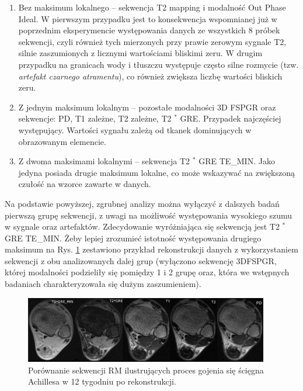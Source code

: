 \begin{enumerate}
	\item Bez maksimum lokalnego -- sekwencja T2 mapping i modalność Out Phase Ideal. W pierwszym przypadku jest to konsekwencja wspomnianej już w poprzednim eksperymencie występowania danych ze wszystkich 8 próbek sekwencji, czyli również tych mierzonych przy prawie zerowym sygnale T2, silnie zaszumionych z licznymi wartościami bliskimi zeru. W drugim przypadku na granicach wody i tłuszczu występuje często silne rozmycie (tzw. \textit{artefakt czarnego atramentu}), co również zwiększa liczbę wartości bliskich zeru.
	\item Z jednym maksimum lokalnym -- pozostałe modalności 3D FSPGR oraz sekwencje: PD, T1 zależne, T2 zależne, T2 $^\ast$ GRE. Przypadek najczęściej występujący. Wartości sygnału zależą od tkanek dominujących w obrazowanym elemencie.
	\item Z dwoma maksimami lokalnymi -- sekwencja T2 $^\ast$ GRE TE\_MIN. Jako jedyna posiada drugie maksimum lokalne, co może wskazywać na zwiększoną czułość na wzorce zawarte w danych.  
	
\end{enumerate}
Na podstawie powyższej, zgrubnej analizy można wyłączyć z dalszych badań pierwszą grupę sekwencji, z uwagi na możliwość występowania wysokiego szumu w sygnale oraz artefaktów. Zdecydowanie wyróżniająca się sekwencją jest T2 $^\ast$ GRE TE\_MIN. Żeby lepiej zrozumieć istotność występowania drugiego maksimum na Rys. \ref{fig:protocol_comp} zestawiono przykład rekonstrukcji danych z wykorzystaniem sekwencji z obu analizowanych dalej grup (wyłączono sekwencję 3DFSPGR, której modalności podzieliły się pomiędzy 1 i 2 grupę oraz, która we wstępnych badaniach charakteryzowała się dużym zaszumieniem). 

 \begin{figure}[h]
 	\centering
 	\includegraphics[width=0.95\textwidth]{figures/Protocol_comparison.png}
 	\caption{Porównanie sekwencji RM ilustrujących proces gojenia się ścięgna Achillesa w 12 tygodniu po rekonstrukcji.}\label{fig:protocol_comp}
 \end{figure}

